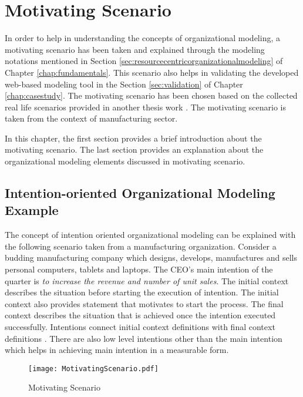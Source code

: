 \chapter{Motivating Scenario}
\label{chap:motivatingScenario}
In order to help in understanding the concepts of organizational modeling, a motivating scenario has been taken and explained through the modeling notations mentioned in Section \ref{sec:resourcecentricorganizationalmodeling} of Chapter \ref{chap:fundamentals}. This scenario also helps in validating the developed web-based modeling tool in the Section \ref{sec:validation} of Chapter \ref{chap:casestudy}. The motivating scenario has been chosen based on the collected real life scenarios provided in another thesis work \cite{Sierr2015}. The motivating scenario is taken from the context of manufacturing sector. 

In this chapter, the first section provides a brief introduction about the motivating scenario. The last section provides an explanation about the organizational modeling elements discussed in motivating scenario. 
\section{Intention-oriented Organizational Modeling Example}
\label{sec:scenario}
 The concept of intention oriented organizational modeling can be explained with the following scenario taken from a manufacturing organization. Consider a budding manufacturing company which designs, develops, manufactures and sells personal computers, tablets and laptops. The CEO's main intention of the quarter is \textit{to increase the revenue and number of unit sales}. The initial context describes the situation before starting the execution of intention. The initial context also provides statement that motivates to start the process. The final context describes the situation that is achieved once the intention executed successfully. Intentions connect initial context definitions with final context definitions \cite{Sungur2014a}. There are also low level intentions other than the main intention which helps in achieving main intention in a measurable form. 
 
  \begin{figure}
  	\centering
  	\texttt{[image: MotivatingScenario.pdf]}
  	\caption{Motivating Scenario}
  	\label{fig:motivatingscenario}
  \end{figure}
  
